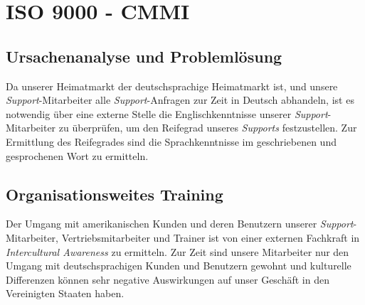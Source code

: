 \section{ISO 9000 - CMMI}
\label{sec:cmmi}
\subsection{Ursachenanalyse und Problemlösung}
\label{sec:cmmi-1}
Da unserer Heimatmarkt der deutschsprachige Heimatmarkt ist, und unsere \emph{Support}-Mitarbeiter alle \emph{Support}-Anfragen zur Zeit in Deutsch abhandeln, ist es notwendig über eine externe Stelle die Englischkenntnisse unserer \emph{Support}-Mitarbeiter zu überprüfen, um den Reifegrad unseres \emph{Supports} festzustellen. Zur Ermittlung des Reifegrades sind die Sprachkenntnisse im geschriebenen und gesprochenen Wort zu ermitteln.
\subsection{Organisationsweites Training}
\label{sec:cmmi-2}
Der Umgang mit amerikanischen Kunden und deren Benutzern unserer  \emph{Support}-Mitarbeiter, Vertriebsmitarbeiter und Trainer ist von einer externen Fachkraft in \emph{Intercultural Awareness} zu ermitteln. Zur Zeit sind unsere Mitarbeiter nur den Umgang mit deutschsprachigen Kunden und Benutzern gewohnt und kulturelle Differenzen können sehr negative Auswirkungen auf unser Geschäft in den Vereinigten Staaten haben.


 